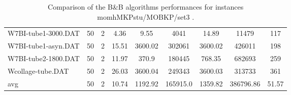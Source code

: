 \begin{table}[!ht]
{\begin{tabular}{lcccccccc}
W7BI-tube1-3000.DAT & 50 & 2 &  \textcolor{blue2}{4.36} & 9.55 & 4041 & 14.89 & 11479 & 117 \\
W7BI-tube1-asyn.DAT & 50 & 2 &  \textcolor{blue2}{15.51} & 3600.02 & 302061 & 3600.02 & 426011 & 198 \\
W7BI-tube2-1800.DAT & 50 & 2 &  \textcolor{blue2}{11.97} & 370.9 & 180445 & 768.35 & 682693 & 259 \\
Wcollage-tube.DAT & 50 & 2 &  \textcolor{blue2}{26.03} & 3600.04 & 249343 & 3600.03 & 313733 & 361 \\
\cline{1-9} avg & 50 & 2 & 10.74 & 1192.92& 165915.0 & 1359.82& 386796.86 & 51.57\\ \cline{1-9}
\bottomrule
\end{tabular}
}%
\caption{Comparison of the B\&B algorithms performances for instances momhMKPstu/MOBKP/set3 .}
\label{tab:table_EPSILONvsBBvsEPBBB_momhMKPstu/MOBKP/set3 }
\end{table}
